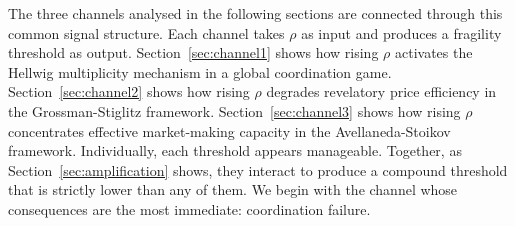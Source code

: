 The three channels analysed in the following sections are connected through this common signal structure. Each channel takes $\rho$ as input and produces a fragility threshold as output. Section~\ref{sec:channel1} shows how rising $\rho$ activates the Hellwig multiplicity mechanism in a global coordination game. Section~\ref{sec:channel2} shows how rising $\rho$ degrades revelatory price efficiency in the Grossman-Stiglitz framework. Section~\ref{sec:channel3} shows how rising $\rho$ concentrates effective market-making capacity in the Avellaneda-Stoikov framework. Individually, each threshold appears manageable. Together, as Section~\ref{sec:amplification} shows, they interact to produce a compound threshold that is strictly lower than any of them. We begin with the channel whose consequences are the most immediate: coordination failure.
